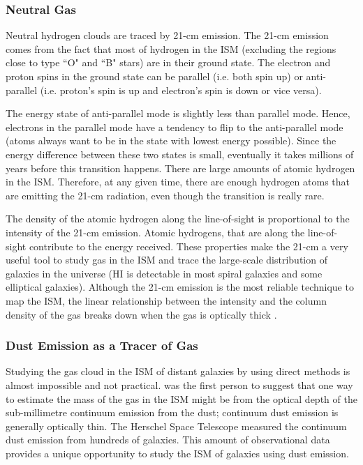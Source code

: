 \subsubsection*{Neutral Gas}

Neutral hydrogen clouds are traced by 21-cm emission. The 21-cm emission comes from the fact that most of hydrogen in the ISM (excluding the regions close to type ``O" and ``B" stars) are in their ground state. The electron and proton spins in the ground state can be parallel (i.e. both spin up) or anti-parallel (i.e. proton's spin is up and electron's spin is down or vice versa). 

The energy state of anti-parallel mode is slightly less than parallel mode. Hence, electrons in the parallel mode have a tendency to flip to the anti-parallel mode (atoms always want to be in the state with lowest energy possible). Since the energy difference between these two states is small, eventually it takes millions of years before this transition happens. There are large amounts of atomic hydrogen in the ISM. Therefore, at any given time, there are enough hydrogen atoms that are emitting the 21-cm radiation, even though the transition is really rare. 

The density of the atomic hydrogen along the line-of-sight is proportional to the intensity of the 21-cm emission. Atomic hydrogens, that are along the line-of-sight contribute to the energy received. These properties make the 21-cm a very useful tool to study gas in the ISM and trace the large-scale distribution of galaxies in the universe (HI is detectable in most spiral galaxies and some elliptical galaxies). Although the 21-cm emission is the most reliable technique to map the ISM, the linear relationship between the intensity and the column density of the gas breaks down when the gas is optically thick \citep{Braun09}.

\subsubsection{Dust Emission as a Tracer of Gas}

Studying the gas cloud in the ISM of distant galaxies by using direct methods is almost impossible and not practical. \cite{Hildebran83} was the first person to suggest that one way to estimate the mass of the gas in the ISM might be from the optical depth of the sub-millimetre continuum emission from the dust; continuum dust emission is generally optically thin. The Herschel Space Telescope \cite{Pilbratt10} measured the continuum dust emission from hundreds of galaxies\citep{Eales10, Oliver12}. This amount of observational data provides a unique opportunity to study the ISM of galaxies using dust emission. 

